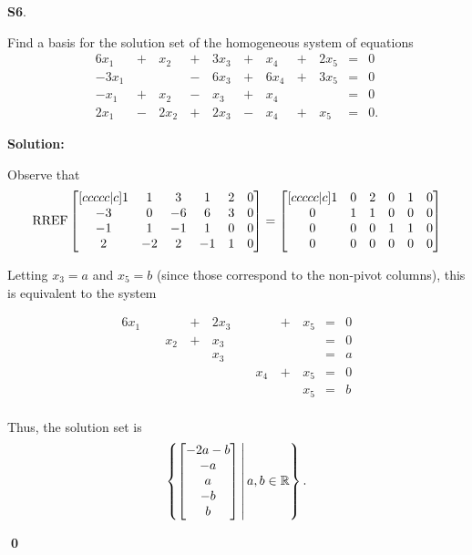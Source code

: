 \documentclass{article}
\newenvironment{problem}[1]
{
  \begin{flushleft}
  \textbf{#1}.
  \ignorespaces
}
{
  \end{flushleft}
}
\newenvironment{solution}
{
  \ignorespaces
  \textbf{Solution:}
}
{
  \ignorespacesafterend
  \begin{flushright}
  {\bfseries \qed}
  \end{flushright}
}
\begin{document}
\begin{problem}{S6}
Find a basis for the solution set of the homogeneous system of equations
\begin{alignat*}{6}
x_1 &\,+\,& x_2 &\,+\,& 3x_3 &\,+\,& x_4 &\,+\,& 2x_5 &=& 0 \\
-3x_1 &\,\,&  &\,-\,& 6x_3 &\,+\,&6 x_4 &\,+\,& 3x_5 &=& 0 \\
-x_1 &\,+\,& x_2 &\,-\,& x_3 &\,+\,& x_4 &\,\,&  &=& 0 \\
2x_1 &\,-\,& 2x_2 &\,+\,& 2x_3 &\,-\,& x_4 &\,+\,& x_5 &=& 0 .
\end{alignat*}
\end{problem}
\begin{solution}
Observe that
\[ \operatorname{RREF}
    \begin{bmatrix}[ccccc|c]
    1 & 1 & 3 & 1 & 2 & 0\\
    -3 & 0 & -6 & 6 & 3 & 0\\
    -1 & 1 & -1 & 1 & 0 & 0\\
    2 & -2 & 2 & -1 & 1& 0
    \end{bmatrix} =
    \begin{bmatrix}[ccccc|c]
    1 & 0 & 2 & 0 & 1 &0\\
    0 & 1 & 1 & 0 & 0 &0\\
    0 & 0 & 0 & 1 & 1 &0\\
    0 & 0 & 0 & 0 & 0&0
    \end{bmatrix}
\]

Letting \(x_3=a\) and \(x_5=b\)
(since those correspond to the non-pivot columns),
this is equivalent to the system

\begin{alignat*}{6}
x_1 &\,\,&  &\,+\,& 2x_3 &\,\,&  &\,+\,& x_5 &=& 0 \\
 &\,\,& x_2 &\,+\,& x_3 &\,\,& &\,\,&  &=& 0 \\
 &\,\,&  &\,\,& x_3 &\,\,&  &\,\,&  &=& a \\
 &\,\,&  &\,\,&  &\,\,& x_4 &\,+\,& x_5 &=& 0 \\
 &\,\,&  &\,\,&  &\,\,&  &\,\,& x_5 &=& b \\
\end{alignat*}

Thus, the solution set is
\[ \left\{\begin{bmatrix} -2a-b \\ -a \\ a \\ -b \\ b \end{bmatrix}\,\middle|\,a,b \in \mathbb{R}\right\} .\]


\end{solution}
\end{document}
